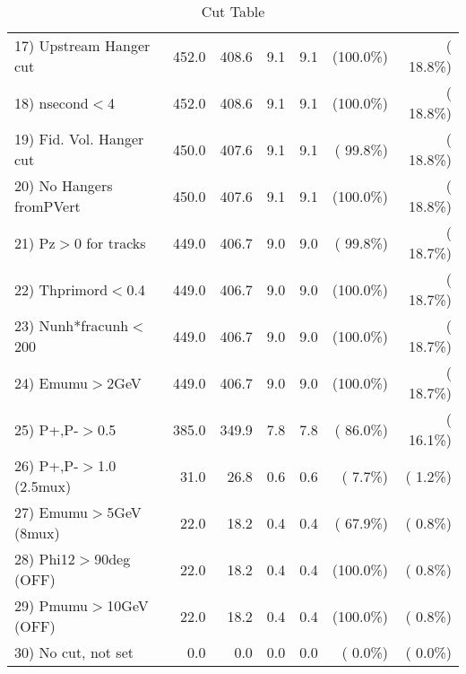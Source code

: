 \begin{table}[h!]
\begin{tabular}{||l||r|r|r|r|r|r||}
 17) Upstream Hanger cut  &        452.0 &        408.6 &          9.1 &          9.1 & (100.0\%) & ( 18.8\%) \\
 18) nsecond$<$4          &        452.0 &        408.6 &          9.1 &          9.1 & (100.0\%) & ( 18.8\%) \\
 19) Fid. Vol. Hanger cut &        450.0 &        407.6 &          9.1 &          9.1 & ( 99.8\%) & ( 18.8\%) \\
 20) No Hangers fromPVert &        450.0 &        407.6 &          9.1 &          9.1 & (100.0\%) & ( 18.8\%) \\
 21) Pz$>$0 for tracks    &        449.0 &        406.7 &          9.0 &          9.0 & ( 99.8\%) & ( 18.7\%) \\
 22) Thprimord$<$0.4      &        449.0 &        406.7 &          9.0 &          9.0 & (100.0\%) & ( 18.7\%) \\
 23) Nunh*fracunh$<$200   &        449.0 &        406.7 &          9.0 &          9.0 & (100.0\%) & ( 18.7\%) \\
 24) Emumu$>$2GeV         &        449.0 &        406.7 &          9.0 &          9.0 & (100.0\%) & ( 18.7\%) \\
 25) P+,P-$>$0.5          &        385.0 &        349.9 &          7.8 &          7.8 & ( 86.0\%) & ( 16.1\%) \\
 26) P+,P-$>$1.0 (2.5mux) &         31.0 &         26.8 &          0.6 &          0.6 & (  7.7\%) & (  1.2\%) \\
 27) Emumu$>$5GeV  (8mux) &         22.0 &         18.2 &          0.4 &          0.4 & ( 67.9\%) & (  0.8\%) \\
 28) Phi12$>$90deg  (OFF) &         22.0 &         18.2 &          0.4 &          0.4 & (100.0\%) & (  0.8\%) \\
 29) Pmumu$>$10GeV  (OFF) &         22.0 &         18.2 &          0.4 &          0.4 & (100.0\%) & (  0.8\%) \\
 30) No cut, not set      &          0.0 &          0.0 &          0.0 &          0.0 & (  0.0\%) & (  0.0\%) \\
 \hline
 \hline
 \end{tabular}
 \caption{Cut Table           }
 \label{tab-cutheavy_neutrino_2.000}
 \end{table}

